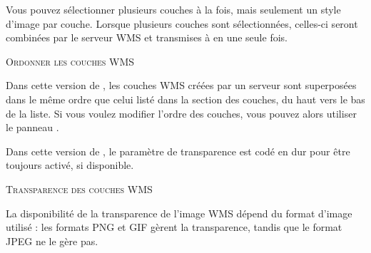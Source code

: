 Vous pouvez sélectionner plusieurs couches à la fois, mais seulement un style  d'image par couche. Lorsque plusieurs couches sont sélectionnées, celles-ci  seront combinées par le serveur WMS et transmises à \qg en une seule fois.

\begin{Tip}[ht]\caption{\textsc{Ordonner les couches WMS}}

Dans cette version de \qg, les couches WMS créées par un serveur sont superposées dans le même ordre que celui listé dans la section des couches, du haut vers le bas de la liste. Si vous voulez modifier l'ordre des couches, vous pouvez alors utiliser le panneau .
\end{Tip}

\label{ogc-wms-transparency}

Dans cette version de \qg, le paramètre de transparence est codé en dur pour  être toujours activé, si disponible.

\begin{Tip}[ht]\caption{\textsc{Transparence des couches WMS}}
La disponibilité de la transparence de l'image WMS dépend du format d'image utilisé : les formats PNG et GIF gèrent la transparence, tandis que le format JPEG ne le gère pas. 
\end{Tip}


